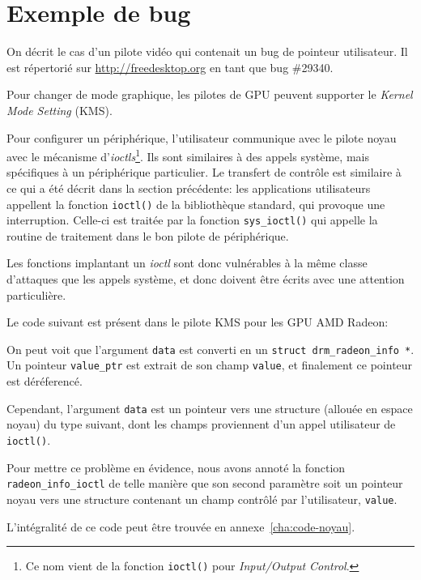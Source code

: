 \section{Exemple de bug}

On décrit le cas d'un pilote vidéo qui contenait un bug de pointeur utilisateur.
Il est répertorié sur \url{http://freedesktop.org} en tant que bug \#29340.

Pour changer de mode graphique, les pilotes de GPU peuvent supporter le
\emph{Kernel Mode Setting} (KMS).

Pour configurer un périphérique, l'utilisateur communique avec le pilote noyau
avec le mécanisme d'\emph{ioctls}\footnote{
  Ce nom vient de la fonction \verb!ioctl()! pour
  \emph{Input/Output Control}.
}.
Ils sont similaires à des appels système, mais spécifiques à un périphérique
particulier. Le transfert de contrôle est similaire à ce qui a été décrit dans
la section précédente: les applications utilisateurs appellent la fonction
\texttt{ioctl()} de la bibliothèque standard, qui provoque une interruption.
Celle-ci est traitée par la fonction \texttt{sys\_ioctl()} qui appelle la
routine de traitement dans le bon pilote de périphérique.

Les fonctions implantant un \emph{ioctl} sont donc vulnérables à la
même classe d'attaques que les appels système, et donc doivent être écrits avec
une attention particulière.

Le code suivant est présent dans le pilote KMS pour les GPU AMD Radeon:


On peut voit que l'argument \texttt{data} est converti en un \texttt{struct
drm\_radeon\_info *}. Un pointeur \texttt{value\_ptr} est extrait de son champ
\texttt{value}, et finalement ce pointeur est déréferencé.

Cependant, l'argument \texttt{data} est un pointeur vers une structure (allouée
en espace noyau) du type suivant, dont les champs proviennent d'un appel
utilisateur de \verb!ioctl()!.


Pour mettre ce problème en évidence, nous avons annoté la fonction
\texttt{radeon\_info\_ioctl} de telle manière que son second paramètre soit un
pointeur noyau vers une structure contenant un champ contrôlé par l'utilisateur,
\texttt{value}.

L'intégralité de ce code peut être trouvée en annexe~\ref{cha:code-noyau}.

